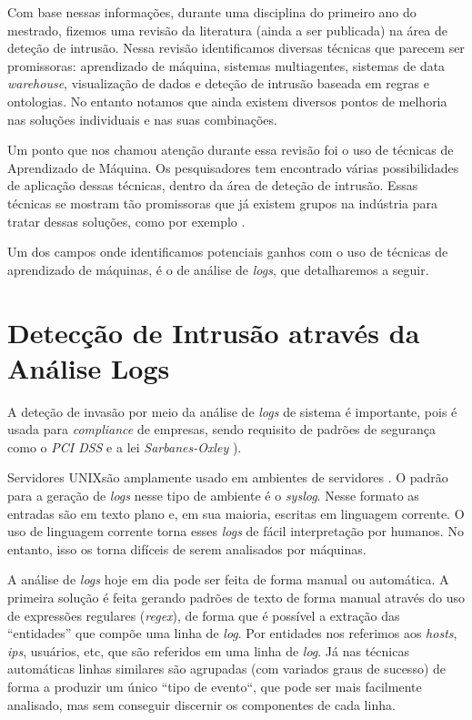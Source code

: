 \documentclass[
	12pt,				%
	openright,			%
	twoside,			%
	a4paper,			%
	english,			%
	spanish,			%
	brazil,				%
	]{abntex2}
\begin{document}
Com base nessas informações, durante uma disciplina do primeiro ano do mestrado, fizemos uma revisão da literatura (ainda a ser publicada)  na área de deteção de intrusão. Nessa revisão identificamos diversas técnicas que parecem ser promissoras: aprendizado de máquina, sistemas multiagentes, sistemas de data \emph{warehouse}, visualização de dados e deteção de intrusão baseada em regras e ontologias. No entanto notamos que ainda existem diversos pontos de melhoria nas soluções individuais e nas suas combinações.

Um ponto que nos chamou atenção durante essa revisão foi o uso de técnicas de Aprendizado de Máquina. Os pesquisadores tem encontrado várias possibilidades de aplicação dessas técnicas, dentro da área de deteção de intrusão. Essas técnicas se mostram tão promissoras que já existem grupos na indústria para tratar dessas soluções, como por exemplo \cite{mlsecproject}.

Um dos campos onde identificamos potenciais ganhos com o uso de técnicas de aprendizado de máquinas, é o de análise de \emph{logs}, que detalharemos a seguir.

\section{Detecção de Intrusão através da Análise Logs}
A deteção de invasão por meio da análise de \emph{logs} de sistema é importante, pois é usada para \emph{compliance} de empresas, sendo requisito de padrões de segurança como o \emph{PCI DSS} e a lei \emph{Sarbanes-Oxley} \cite{prakhar2012log}).

Servidores UNIX\texttrademark  são amplamente usado em ambientes de servidores \cite{w3techs-osusage}. O padrão para a geração de \emph{logs} nesse tipo de ambiente é o \emph{syslog}. Nesse formato as entradas são em texto plano e, em sua maioria, escritas em linguagem corrente. O uso de linguagem corrente torna esses \emph{logs} de fácil interpretação por humanos. No entanto, isso os torna difíceis de serem analisados por máquinas. 

A análise de \emph{logs} hoje em dia pode ser feita de forma manual ou automática. A primeira solução é feita gerando padrões de texto de forma manual através do uso de expressões regulares (\emph{regex}), de forma que é possível a extração das ``entidades'' que compõe uma linha de \emph{log}. Por entidades nos referimos aos \emph{hosts}, \emph{ips}, usuários, etc, que são referidos em uma linha de \emph{log}. Já nas técnicas automáticas linhas similares são agrupadas (com variados graus de sucesso) de forma a produzir um único ``tipo de evento``, que pode ser mais facilmente analisado, mas sem conseguir discernir os componentes de cada linha.
\end{document}
